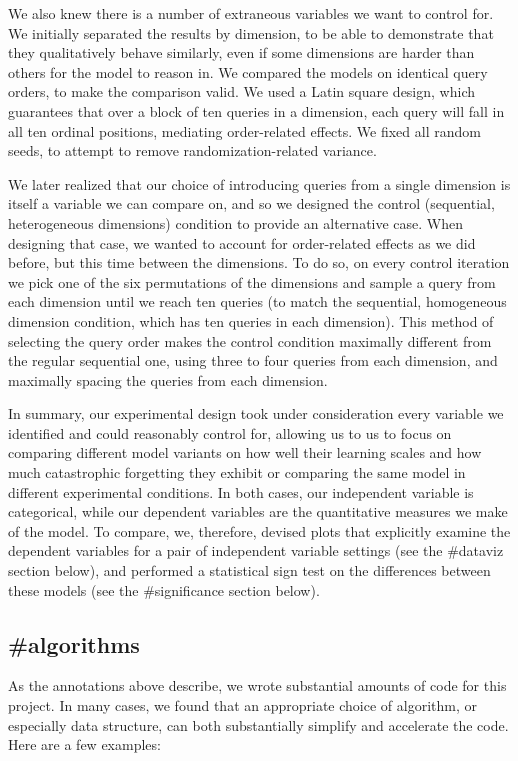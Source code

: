 We also knew there is a number of extraneous variables we want to control for. We initially separated the results by dimension, to be able to demonstrate that they qualitatively behave similarly, even if some dimensions are harder than others for the model to reason in. We compared the models on identical query orders, to make the comparison valid. We used a Latin square design, which guarantees that over a block of ten queries in a dimension, each query will fall in all ten ordinal positions, mediating order-related effects. We fixed all random seeds, to attempt to remove randomization-related variance. 

We later realized that our choice of introducing queries from a single dimension is itself a variable we can compare on, and so we designed the control (sequential, heterogeneous dimensions) condition to provide an alternative case. When designing that case, we wanted to account for order-related effects as we did before, but this time between the dimensions. To do so, on every control iteration we pick one of the six permutations of the dimensions and sample a query from each dimension until we reach ten queries (to match the sequential, homogeneous dimension condition, which has ten queries in each dimension). This method of selecting the query order makes the control condition maximally different from the regular sequential one, using three to four queries from each dimension, and maximally spacing the queries from each dimension.

In summary, our experimental design took under consideration every variable we identified and could reasonably control for, allowing us to us to focus on comparing different model variants on how well their learning scales and how much catastrophic forgetting they exhibit or comparing the same model in different experimental conditions. In both cases, our independent variable is categorical, while our dependent variables are the quantitative measures we make of the model. To compare, we, therefore, devised plots that explicitly examine the dependent variables for a pair of independent variable settings (see the \#dataviz section below), and performed a statistical sign test on the differences between these models (see the \#significance section below).

\subsection{\#algorithms}
As the annotations above describe, we wrote substantial amounts of code for this project. In many cases, we found that an appropriate choice of algorithm, or especially data structure, can both substantially simplify and accelerate the code. Here are a few examples:

